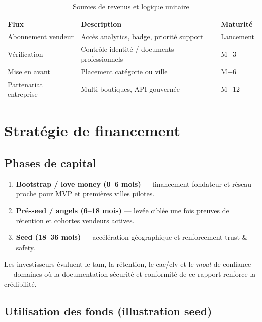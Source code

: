 \begin{table}[H]
  \centering
  \caption{Sources de revenus et logique unitaire}
  \label{tab:revenue-streams}
  \begin{tabularx}{\textwidth}{@{}lXl@{}}
    \toprule
    \textbf{Flux} & \textbf{Description} & \textbf{Maturité} \\
    \midrule
    Abonnement vendeur & Accès analytics, badge, priorité support & Lancement \\
    Vérification & Contrôle identité / documents professionnels & M+3 \\
    Mise en avant & Placement catégorie ou ville & M+6 \\
    Partenariat entreprise & Multi-boutiques, API gouvernée & M+12 \\
    \bottomrule
  \end{tabularx}
\end{table}

\section{Stratégie de financement}

\subsection{Phases de capital}

\begin{enumerate}
  \item \textbf{Bootstrap / love money (0--6 mois)} --- financement fondateur et réseau proche pour MVP et premières villes pilotes.
  \item \textbf{Pré-seed / angels (6--18 mois)} --- levée ciblée une fois preuves de rétention et cohortes vendeurs actives.
  \item \textbf{Seed (18--36 mois)} --- accélération géographique et renforcement trust \& safety.
\end{enumerate}

Les investisseurs évaluent le \gls{tam}, la rétention, le \gls{cac}/\gls{clv} et le \emph{moat} de confiance --- domaines où la documentation sécurité et conformité de ce rapport renforce la crédibilité.

\subsection{Utilisation des fonds (illustration seed)}

